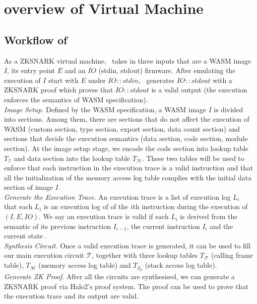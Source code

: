 \section{overview of \zkwasm Virtual Machine}
\subsection{Workflow of \zkwasm}
As a ZKSNARK virtual machine, \zkwasm\, takes in three inputs that are a WASM image $I$, its entry point $E$ and an $IO$ (stdin, stdout) firmware. After emulating the execution of $I$ start with $E$ under $IO::stdin$, \zkwasm\, generates $IO::stdout$ with a ZKSNARK proof which proves that $IO::stdout$ is a valid output (the execution enforces the semantics of WASM specification).\\

\noindent\emph{Image Setup.}
Defined by the WASM specification, a WASM image $I$ is divided into sections. Among them, there are sections that do not affect the execution of WASM (custom section, type section, export section, data count section) and sections that decide the execution semantics (data section, code section, module section). At the image setup stage, we encode the code section into lookup table $T_\mathcal{I}$ and data section into the lookup table $T_\mathcal{H}$. These two tables will be used to enforce that each instruction in the execution trace is a valid instruction and that all the initialization of the memory access log table complies with the initial data section of image $I$.\\

\noindent\emph{Generate the Execution Trace.}
An execution trace is a list of execution log $L_i$ that each $L_i$ is an execution log of of the $i$th instruction during the execution of $(I, E, IO)$. We say an execution trace is valid if each $L_i$ is derived from the semantic of its previous instruction $I_{i-1}$, the current instruction $I_{i}$ and the current state \fullstate.\\

\noindent\emph{Synthesis Circuit.}
Once a valid execution trace is generated, it can be used to fill our main execution circuit $\mathcal{T}$, together with three lookup tables $T_\mathcal{F}$ (calling frame table), $T_\mathcal{M}$ (memory access log table) and $T_{\mathcal{S}_p}$ (stack access log table). \\

\noindent\emph{Generate ZK Proof.}
After all the circuits are synthesised, we can generate a ZKSNARK proof via Halo2's proof system. The proof can be used to prove that the execution trace and its output are valid.

